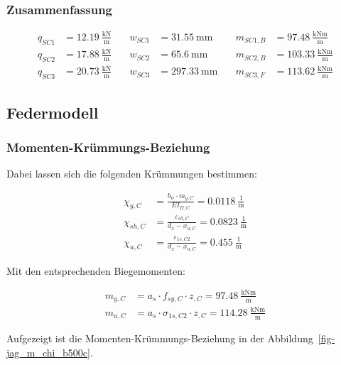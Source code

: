 \documentclass[
  11pt,
  letterpaper,
]{scrreprt}
\begin{document}
\subsubsection{Zusammenfassung}\label{zusammenfassung-3}

\[
\begin{aligned}
q_{SC1}& = 12.19 \ \frac{\mathrm{kN}}{\mathrm{m}} \quad & w_{SC1}& = 31.55 \ \mathrm{mm} \quad & m_{SC1 , B}& = 97.48 \ \frac{\mathrm{kNm}}{\mathrm{m}} \\ 
q_{SC2}& = 17.88 \ \frac{\mathrm{kN}}{\mathrm{m}} \quad & w_{SC2}& = 65.6 \ \mathrm{mm} \quad & m_{SC2 , B}& = 103.33 \ \frac{\mathrm{kNm}}{\mathrm{m}} \\ 
q_{SC3}& = 20.73 \ \frac{\mathrm{kN}}{\mathrm{m}} \quad & w_{SC3}& = 297.33 \ \mathrm{mm} \quad & m_{SC3 , F}& = 113.62 \ \frac{\mathrm{kNm}}{\mathrm{m}} \end{aligned}
\]

\subsection{Federmodell}\label{federmodell-1}

\subsubsection{Momenten-Krümmungs-Beziehung}\label{momenten-kruxfcmmungs-beziehung-1}

Dabei lassen sich die folgenden Krümmungen bestimmen:

\[
\begin{aligned}
\chi_{y , C}& = \frac{b_{w} \cdot m_{y , C}}{EI_{II , C}} = 0.0118 \ \frac{1}{\mathrm{m}} \\ 
\chi_{sh , C}& = \frac{\varepsilon_{sh , C}}{d_{x} - x_{u , C}} = 0.0823 \ \frac{1}{\mathrm{m}} \\ 
\chi_{u , C}& = \frac{\varepsilon_{1 s , C2}}{d_{x} - x_{u , C}} = 0.455 \ \frac{1}{\mathrm{m}} \end{aligned}
\]

Mit den entsprechenden Biegemomenten:

\[
\begin{aligned}
m_{y , C}& = a_{s} \cdot f_{sy , C} \cdot z_{, C} = 97.48 \ \frac{\mathrm{kNm}}{\mathrm{m}} \\ 
m_{u , C}& = a_{s} \cdot \sigma_{1 s , C2} \cdot z_{, C} = 114.28 \ \frac{\mathrm{kNm}}{\mathrm{m}} \end{aligned}
\]

Aufgezeigt ist die Momenten-Krümmungs-Beziehung in der
Abbildung~\ref{fig-jag_m_chi_b500c}.
\end{document}
